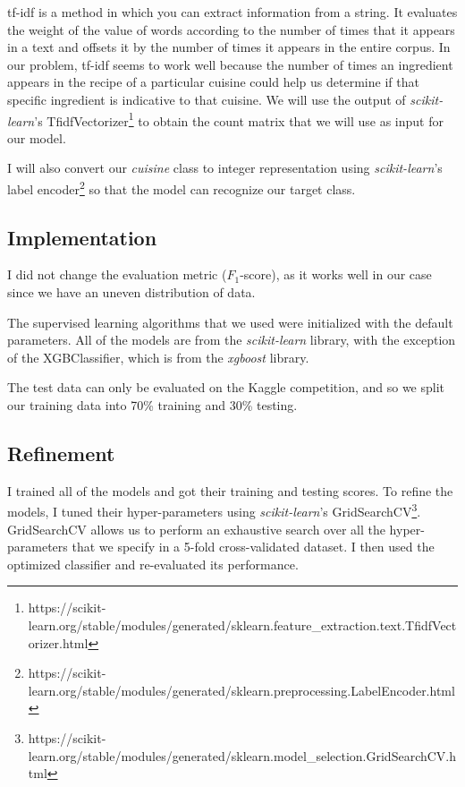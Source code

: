 \documentclass[12pt]{article}
\begin{document}
tf-idf is a method in which you can extract information from a string. It evaluates the weight of the value of words according to the number of times that it appears in a text and offsets it by the number of times it appears in the entire corpus. In our problem, tf-idf seems to work well because the number of times an ingredient appears in the recipe of a particular cuisine could help us determine if that specific ingredient is indicative to that cuisine. We will use the output of \textit{scikit-learn}'s TfidfVectorizer\footnote{https://scikit-learn.org/stable/modules/generated/sklearn.feature\_extraction.text.TfidfVectorizer.html} to obtain the count matrix that we will use as input for our model.

I will also convert our \textit{cuisine} class to integer representation using \textit{scikit-learn}'s label encoder\footnote{https://scikit-learn.org/stable/modules/generated/sklearn.preprocessing.LabelEncoder.html} so that the model can recognize our target class.

\subsection{Implementation}
I did not change the evaluation metric ($F_1$-score), as it works well in our case since we have an uneven distribution of data.

The supervised learning algorithms that we used were initialized with the default parameters. All of the models are from the \textit{scikit-learn} library, with the exception of the XGBClassifier, which is from the \textit{xgboost} library.

The test data can only be evaluated on the Kaggle competition, and so we split our training data into 70\% training and 30\% testing.

\subsection{Refinement}

I trained all of the models and got their training and testing scores. To refine the models, I tuned their hyper-parameters using \textit{scikit-learn}'s GridSearchCV\footnote{https://scikit-learn.org/stable/modules/generated/sklearn.model\_selection.GridSearchCV.html}. GridSearchCV allows us to perform an exhaustive search over all the hyper-parameters that we specify in a 5-fold cross-validated dataset. I then used the optimized classifier and re-evaluated its performance.
\end{document}
